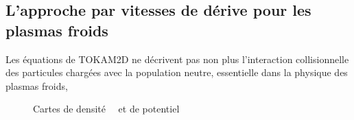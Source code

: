 \begin{refsection}
\section{L'approche par vitesses de dérive pour les plasmas
froids}
\label{vitessesDerivePlasmaFroid}
\parencite{Sudan}
Les équations de TOKAM2D ne décrivent pas non plus l'interaction
collisionnelle des particules chargées avec la population neutre, essentielle dans la physique des plasmas froids,
\begin{figure}[!htbp]
    \centering
    \caption{Cartes de densité ~~et de potentiel
    }
    \label{2-CartesWithTe}
	\end{figure}
%
%

\end{refsection}




